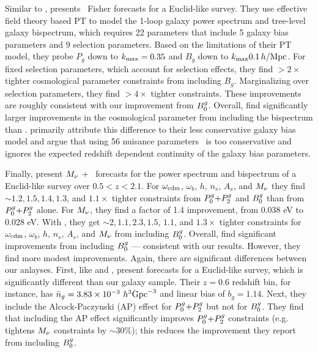 Similar to \cite{yankelevich2019}, \cite{agarwal2020} presents \lcdm~Fisher 
forecasts for a Euclid-like survey. 
They use effective field theory based PT to model the
1-loop galaxy power spectrum and tree-level galaxy bispectrum, which
requires 22 parameters that include 5 galaxy bias parameters and 9 selection 
parameters. Based on the limitations of their PT model, they probe 
$P_g$ down to $k_{\rm max} = 0.35$ and $B_g$ down to $k_{\rm max} 0.1\,h/\mathrm{Mpc}$. 
For fixed selection parameters, which account for selection effects, they find $>2\times$
tighter cosmological parameter constraints from including $B_g$. Marginalizing
over selection parameters, they find $>4\times$ tighter constraints. These 
improvements are roughly consistent with our improvement from $B^g_0$. 
Overall, \cite{agarwal2020} find significantly larger improvements in the
cosmological parameter from including the bispectrum than \cite{yankelevich2019}. 
\cite{agarwal2020} primarily attribute this difference to their less conservative
galaxy bias model and argue that using 56 nuisance parameters~\citep{yankelevich2019} 
is too conservative and ignores the expected redshift dependent continuity 
of the galaxy bias parameters. 

Finally, \cite{chudaykin2019} present $M_\nu$ + \lcdm~forecasts for the power
spectrum and bispectrum of a Euclid-like survey over $0.5 < z < 2.1$. For
$\omega_{\rm cdm}$, $\omega_b$, $h$, $n_s$, $A_s$, and $M_\nu$ they find
${\sim}1.2, 1.5, 1.4, 1.3$, and $1.1\times$ tighter constraints from $P^g_0{+}P^g_2$ and
$B^g_0$ than from $P^g_0{+}P^g_2$ alone. For $M_\nu$, they find a factor of 1.4 improvement, 
from 0.038 eV to 0.028 eV. With \planck, they get ${\sim}2, 1.1, 2.3, 1.5$,
$1.1$, and $1.3\times$ tighter constraints for $\omega_{\rm cdm}$, $\omega_b$,
$h$, $n_s$, $A_s$, and $M_\nu$ from including $B^g_0$. Overall, \cite{chudaykin2019} 
find significant improvements from including $B^g_0$ --- consistent with our
results. However, they find more modest improvements. 
Again, there are significant differences between our anlayses. First, like
\cite{yankelevich2019} and \cite{agarwal2020}, \cite{chudaykin2019} present forecasts for a
Euclid-like survey, which is significantly different than our galaxy sample.
Their $z = 0.6$ redshift bin, for instance, has $\bar{n}_g = 3.83 \times 10^{-3}~h^3{\rm
Gpc}^{-3}$ and linear bias of $b_g = 1.14$. Next, they include the
Alcock-Paczynski (AP) effect for $P^g_0{+}P^g_2$ but not for $B^g_0$. They find that
including the AP effect significantly improves $P^g_0{+}P^g_2$ constraints (e.g.
tightens $M_\nu$ constraints by ${\sim}30\%$); this reduces the improvement
they report from including $B^g_0$. 

